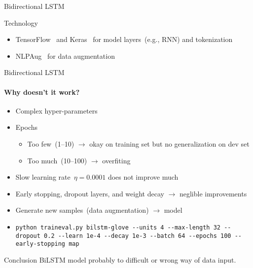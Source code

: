 \documentclass[english,handout]{mlutalk}
\newcommand{\BiLSTM}{\mbox{BiLSTM}\xspace}
\begin{document}
\begin{frame}[allowframebreaks]{Bidirectional LSTM}
  \begin{block}{Technology}
      \begin{itemize}
        \item TensorFlow~\cite{Abadi2015} and Keras~\cite{Chollet2015} for model layers~(e.g., RNN) and tokenization
        \item NLPAug~\cite{Edward2019} for data augmentation
      \end{itemize}
  \end{block}

\end{frame}

\begin{frame}{Bidirectional LSTM}
  \framesubtitle{Why doesn't it work?}

  \begin{itemize}
    \item Complex hyper-parameters
    \item Epochs
    \begin{itemize}
      \item Too few~(1--10) \(\to\) okay on training set but no generalization on dev set
      \item Too much~(10--100) \(\to\) overfiting
    \end{itemize}
    \item Slow learning rate~\(\eta = 0.0001\) does not improve much
    \item Early stopping, dropout layers, and weight decay \(\to\) neglible improvements
    \item Generate new samples~(data augmentation) \(\to\)  model
    \item {\tiny\lstinline{python traineval.py bilstm-glove --units 4 --max-length 32 --dropout 0.2 --learn 1e-4 --decay 1e-3 --batch 64 --epochs 100 --early-stopping map}}
  \end{itemize}

  \begin{block}{Conclusion}
    \BiLSTM model probably to difficult or wrong way of data input.
  \end{block}

\end{frame}
\end{document}
